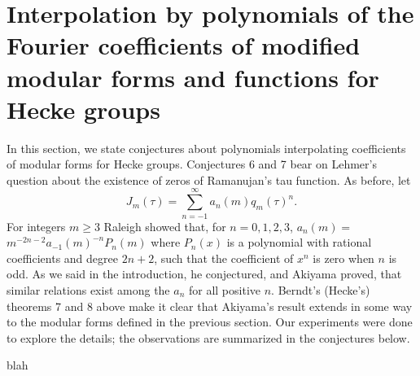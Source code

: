 \documentclass{article}
\begin{document}
\section[]{Interpolation by polynomials of 
the Fourier coefficients of modified 
modular forms and functions for Hecke groups}
In this section, we state conjectures about
polynomials interpolating coefficients of
modular forms for Hecke groups.
Conjectures 6 and 7
bear on Lehmer's question about
the existence of zeros of Ramanujan's
tau function.
\newline \newline \noindent
As before, let
$$
J_m(\tau) = 
\sum_{n = -1}^{\infty}a_n(m) q_m(\tau)^n.
$$
For integers $m \geq 3$ 
Raleigh showed that,
for $n = 0, 1, 2, 3$, 
$a_n(m) = $
\newline
$m^{-2n-2} a_{-1}(m)^{-n} P_n(m)$
where $P_n(x)$ is a polynomial with rational
coefficients and degree $2n+2$,
such that the coefficient of $x^n$
is zero when $n$ is odd.
As we said in the introduction,
he conjectured, and Akiyama proved,
that similar relations
exist among the $a_n$ for 
all positive $n$.
\newline \newline \noindent
Berndt's (Hecke's) theorems
7 and 8 above make it clear that 
 Akiyama's result 
extends in some way to the 
modular forms defined in
the previous section. Our
experiments were done to
explore the details; 
the observations are summarized
in the conjectures below.
\begin{conjecture}
blah
\end{conjecture}
\end{document}
